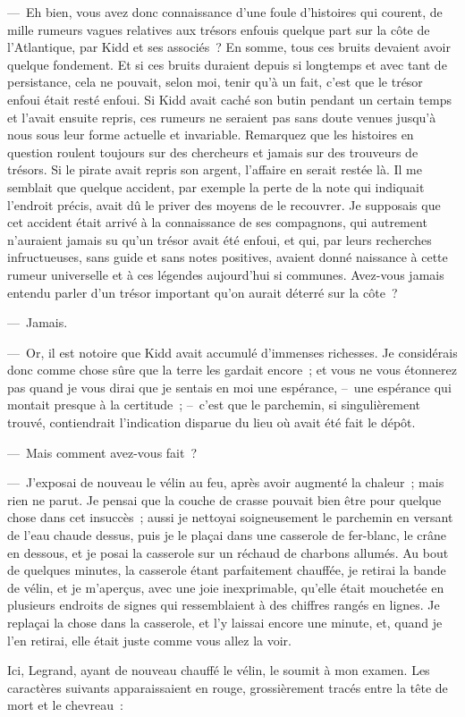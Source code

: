 \documentclass[french,twoside]{book} %
\begin{document}
— Eh bien, vous avez donc connaissance d’une foule d’histoires qui courent, de mille rumeurs vagues relatives aux trésors enfouis quelque part sur la côte de l’Atlantique, par Kidd et ses associés ? En somme, tous ces bruits devaient avoir quelque fondement. Et si ces bruits duraient depuis si longtemps et avec tant de persistance, cela ne pouvait, selon moi, tenir qu’à un fait, c’est que le trésor enfoui était resté enfoui. Si Kidd avait caché son butin pendant un certain temps et l’avait ensuite repris, ces rumeurs ne seraient pas sans doute venues jusqu’à nous sous leur forme actuelle et invariable. Remarquez que les histoires en question roulent toujours sur des chercheurs et jamais sur des trouveurs de trésors. Si le pirate avait repris son argent, l’affaire en serait restée là. Il me semblait que quelque accident, par exemple la perte de la note qui indiquait l’endroit précis, avait dû le priver des moyens de le recouvrer. Je supposais que cet accident était arrivé à la connaissance de ses compagnons, qui autrement n’auraient jamais su qu’un trésor avait été enfoui, et qui, par leurs recherches infructueuses, sans guide et sans notes positives, avaient donné naissance à cette rumeur universelle et à ces légendes aujourd’hui si communes. Avez-vous jamais entendu parler d’un trésor important qu’on aurait déterré sur la côte ?\par
— Jamais.\par
— Or, il est notoire que Kidd avait accumulé d’immenses richesses. Je considérais donc comme chose sûre que la terre les gardait encore ; et vous ne vous étonnerez pas quand je vous dirai que je sentais en moi une espérance, – une espérance qui montait presque à la certitude ; – c’est que le parchemin, si singulièrement trouvé, contiendrait l’indication disparue du lieu où avait été fait le dépôt.\par
— Mais comment avez-vous fait ?\par
— J’exposai de nouveau le vélin au feu, après avoir augmenté la chaleur ; mais rien ne parut. Je pensai que la couche de crasse pouvait bien être pour quelque chose dans cet insuccès ; aussi je nettoyai soigneusement le parchemin en versant de l’eau chaude dessus, puis je le plaçai dans une casserole de fer-blanc, le crâne en dessous, et je posai la casserole sur un réchaud de charbons allumés. Au bout de quelques minutes, la casserole étant parfaitement chauffée, je retirai la bande de vélin, et je m’aperçus, avec une joie inexprimable, qu’elle était mouchetée en plusieurs endroits de signes qui ressemblaient à des chiffres rangés en lignes. Je replaçai la chose dans la casserole, et l’y laissai encore une minute, et, quand je l’en retirai, elle était juste comme vous allez la voir.\par
Ici, Legrand, ayant de nouveau chauffé le vélin, le soumit à mon examen. Les caractères suivants apparaissaient en rouge, grossièrement tracés entre la tête de mort et le chevreau :\par
\end{document}
